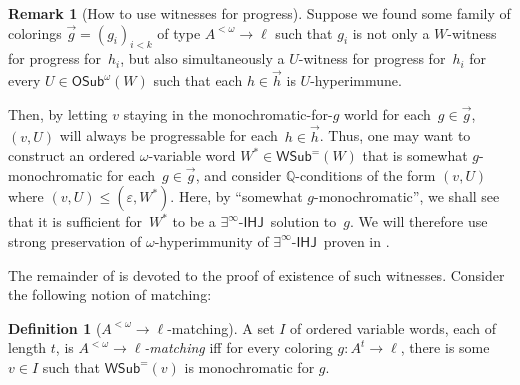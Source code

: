 \documentclass{article}
\def\msf{\mathsf}
\def\wsamelong{\mathsf{WSub}^{=}}
\def\hjsufficient{$A^{<\omega}\rightarrow\ell$-matching}%
\def\wHJ{$\exists^\infty$-$\msf{IHJ}$}
\def\QQ{\mathbb{Q}}
\newcommand{\OSub}{\mathsf{OSub}}
\def\qt#1{``#1''}%
\numberwithin{theorem}{section}
\theoremstyle{definition}
\newtheorem{remark}[theorem]{Remark}
\newtheorem{definition}[theorem]{Definition}
\begin{document}
\begin{remark}[How to use witnesses for progress]
\label{scaOVW-rem1}
Suppose we found some family of colorings $\vec{g} = (g_i)_{i < k}$ of type $A^{<\omega} \to \ell$ such that $g_i$ is not only a $W$-witness for progress for~$h_i$, but also simultaneously a $U$-witness for progress for~$h_i$ for every $U \in \OSub^\omega(W)$ such that each $h \in \vec{h}$ is $U$-hyperimmune.

Then, by letting $v$ staying in the monochromatic-for-$g$ world for each~$g \in \vec{g}$,
$(v,U)$ will always be progressable for each~$h \in \vec{h}$.
Thus, one may want to construct an ordered $\omega$-variable word
$W^*\in \wsamelong(W)$ that is somewhat $g$-monochromatic for each~$g \in \vec{g}$,
and consider $\QQ$-conditions of the form $(v,U)$
where $(v, U)\leq (\varepsilon, W^*)$.
Here, by \qt{somewhat $g$-monochromatic}, we shall see that it is sufficient for~$W^*$ to be a \wHJ\  solution to~$g$. We will therefore use strong preservation of $\omega$-hyperimmunity of \wHJ\ proven in .
\end{remark}



The remainder of  is devoted to the proof of existence of such witnesses.
Consider the following notion of matching:

\begin{definition}[\hjsufficient]
A set $I$ of ordered variable words, each of length $t$,
is \emph{\hjsufficient} iff
for every coloring $g: A^t\rightarrow \ell$,
there is some  $v\in I$ such that
$\wsamelong(v)$ is monochromatic for $g$.
\end{definition}
\end{document}
